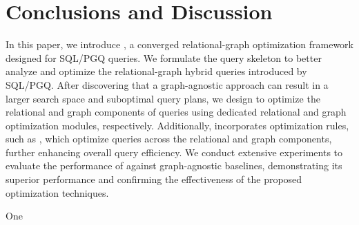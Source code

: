 \vspace{-5mm}
\section{Conclusions and Discussion}
\label{sec:conclusions}

In this paper, we introduce \name, a converged relational-graph optimization framework designed for SQL/PGQ queries. We formulate the \spjm query skeleton to better analyze and optimize the relational-graph hybrid queries introduced by SQL/PGQ. After discovering that a graph-agnostic approach can result in a larger search space and suboptimal query plans, we design \name to optimize the relational and graph components of \spjm queries using dedicated relational and graph optimization modules, respectively. Additionally, \name incorporates optimization rules, such as \filterrule, which optimize queries across the relational and graph components, further enhancing overall query efficiency. We conduct extensive experiments to evaluate the performance of \name against graph-agnostic baselines, demonstrating its superior performance and confirming the effectiveness of the proposed optimization techniques.



One 





\balance
